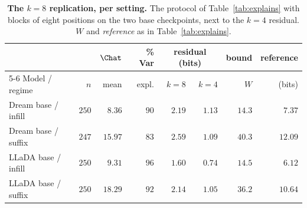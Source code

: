 \begin{table}[!ht]
\centering
\footnotesize
\setlength{\tabcolsep}{5pt}
\begin{tabular}{lrrrrrrr}
\toprule
 & & \multicolumn{1}{c}{$\Chat$} & \% Var & \multicolumn{2}{c}{residual (bits)} & bound & reference \\
\cmidrule(lr){5-6}
Model / regime & $n$ & mean & expl. & $k{=}8$ & $k{=}4$ & $W$ & (bits) \\
\midrule
Dream base / infill & $250$ & $8.36$ & $90$ & $2.19$ & $1.13$ & $14.3$ & $7.37$ \\
Dream base / suffix & $247$ & $15.97$ & $83$ & $2.59$ & $1.09$ & $40.3$ & $12.09$ \\
LLaDA base / infill & $250$ & $9.31$ & $96$ & $1.60$ & $0.74$ & $14.5$ & $6.12$ \\
LLaDA base / suffix & $250$ & $18.29$ & $92$ & $2.14$ & $1.05$ & $36.2$ & $10.64$ \\
\bottomrule
\end{tabular}
\caption{\textbf{The $k{=}8$ replication, per setting.} The protocol of
Table~\ref{tab:explains} with blocks of eight positions on the two base checkpoints, next
to the $k{=}4$ residual. $W$ and \emph{reference} as in Table~\ref{tab:explains}.}\label{tab:k8}
\end{table}
